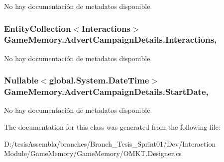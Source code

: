 No hay documentación de metadatos disponible. 

\hypertarget{class_game_memory_1_1_advert_campaign_details_aed4bd9e4877c0af4c00f36a578213ac0}{
\subsubsection[{Interactions}]{\setlength{\rightskip}{0pt plus 5cm}Entity\-Collection$<${\bf Interactions}$>$ Game\-Memory.\-Advert\-Campaign\-Details.\-Interactions\hspace{0.3cm}{\ttfamily [get]}, {\ttfamily [set]}}}\label{class_game_memory_1_1_advert_campaign_details_aed4bd9e4877c0af4c00f36a578213ac0}


No hay documentación de metadatos disponible. 

\hypertarget{class_game_memory_1_1_advert_campaign_details_a944d2e6fa9b724a2a2c6dcc83435c943}{
\subsubsection[{Start\-Date}]{\setlength{\rightskip}{0pt plus 5cm}Nullable$<$global.\-System.\-Date\-Time$>$ Game\-Memory.\-Advert\-Campaign\-Details.\-Start\-Date\hspace{0.3cm}{\ttfamily [get]}, {\ttfamily [set]}}}\label{class_game_memory_1_1_advert_campaign_details_a944d2e6fa9b724a2a2c6dcc83435c943}


No hay documentación de metadatos disponible. 



The documentation for this class was generated from the following file\-:\begin{DoxyCompactItemize}
\item 
D\-:/tesis\-Assembla/branches/\-Branch\-\_\-\-Tesis\-\_\-\-Sprint01/\-Dev/\-Interaction Module/\-Game\-Memory/\-Game\-Memory/O\-M\-K\-T.\-Designer.\-cs\end{DoxyCompactItemize}

